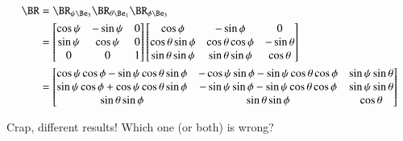 \documentclass{article}
\begin{document}
\begin{align*}
\BR 
&= \BR_{\psi \Be_3} \BR_{\theta \Be_1} \BR_{\phi \Be_3} \\
&=
\begin{bmatrix}
\cos\psi & - \sin\psi & 0 \\
\sin\psi & \cos\psi & 0 \\
0 & 0 & 1 \\
\end{bmatrix}
\begin{bmatrix}
\cos\phi             & -\sin\phi             & 0 \\
\cos\theta\sin\phi   & \cos\theta\cos\phi    & -\sin\theta \\
\sin\theta\sin\phi   & \sin\theta\sin\phi    & \cos\theta \\
\end{bmatrix} \\
&=
\begin{bmatrix}
\cos\psi \cos\phi - \sin\psi \cos\theta \sin\phi & -\cos\psi \sin\phi -\sin\psi \cos\theta\cos\phi & \sin\psi \sin\theta \\
\sin\psi \cos\phi + \cos\psi \cos\theta \sin\phi & -\sin\psi \sin\phi -\sin\psi \cos\theta\cos\phi & \sin\psi \sin\theta \\
                                                     \sin\theta \sin\phi & \sin\theta\sin\phi & \cos\theta \\
\end{bmatrix} \\
\end{align*}

Crap, different results!  Which one (or both) is wrong?

\end{document}
